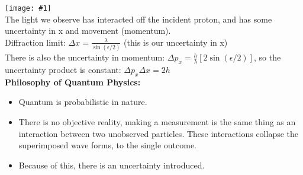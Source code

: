 \documentclass[10pt,landscape,a4paper]{article}
\newcommand{\inlineimage}[1]{\texttt{[image: \#1]}\\}
\renewcommand{\^}[1]{\ensuremath{\hat{#1}}}
\begin{document}
\begin{multicols}{4}
	\inlineimage{hmicro.png}
	The light we observe has interacted off the incident proton, and has some uncertainty in x and movement (momentum).\\ 
	Diffraction limit: $ \Delta x = \frac{\lambda}{\sin(\epsilon/2)} $ (this is our uncertainty in x)\\
	There is also the uncertainty in momentum: $ \Delta p_x=\frac{h}{\lambda}[2\sin(\epsilon/2)] $, so the uncertainty product is constant: $ \Delta p_x \Delta x = 2h $\\
	\textbf{Philosophy of Quantum Physics:}\\
	\begin{itemize}
		\item Quantum is probabilistic in nature.
		\item There is no objective reality, making a measurement is the same thing as an interaction between two unobserved particles. These interactions collapse the superimposed wave forms, to the single outcome.
		\item Because of this, there is an uncertainty introduced. 
	\end{itemize}
	

\end{multicols}
\end{document}
